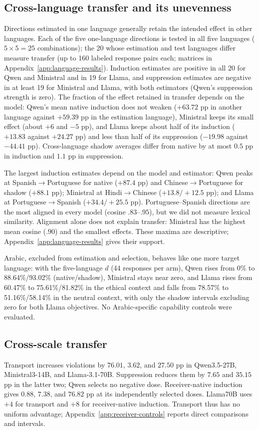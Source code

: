 \subsection{Cross-language transfer and its unevenness}
\label{sec:cross-language}
Directions estimated in one language generally retain the intended effect in other languages. Each
of the five one-language directions is tested in all five languages
($5 \times 5 = 25$ combinations); the 20 whose estimation and test
languages differ measure transfer (up to 160 labeled response pairs each; matrices in
Appendix~\ref{app:language-results}). Induction estimates are positive in all 20 for
Qwen and Ministral and in 19 for Llama, and suppression estimates are negative in at
least 19 for Ministral and Llama, with both estimators (Qwen's
suppression strength is zero). The fraction of the effect retained in transfer depends on the model: Qwen's mean native induction does not weaken ($+63.72$ pp in another language against $+59.39$ pp in the estimation language), Ministral keeps its small effect (about $+6$ and $-5$ pp), and Llama keeps about half of its induction ($+13.83$ against $+24.27$ pp) and less than half of its suppression ($-19.98$ against $-44.41$ pp). Cross-language shadow averages differ from native by at most $0.5$ pp in induction and $1.1$ pp in suppression.

The largest induction estimates depend on the model and estimator:
Qwen peaks at Spanish$\to$Portuguese for native ($+87.4$ pp) and
Chinese$\to$Portuguese for shadow ($+88.1$ pp); Ministral at
Hindi$\to$Chinese ($+13.8/+12.5$ pp); and Llama at
Portuguese$\to$Spanish ($+34.4/+25.5$ pp).
Portuguese--Spanish directions are the most aligned in every model
(cosine $.83$--$.95$), but we did not measure lexical similarity.
Alignment alone does not explain transfer: Ministral has the highest
mean cosine ($.90$) and the smallest effects. These maxima are
descriptive; Appendix~\ref{app:language-results} gives their support.

Arabic, excluded from estimation and selection, behaves like one more target language: with the five-language $d$ (44 responses per arm), Qwen rises from 0\% to 88.64\%/93.02\% (native/shadow), Ministral stays near zero, and Llama rises from 60.47\% to 75.61\%/81.82\% in the ethical context and falls from 78.57\% to 51.16\%/58.14\% in the neutral context, with only the shadow intervals excluding zero for both Llama objectives. No Arabic-specific capability controls were evaluated.

\subsection{Cross-scale transfer}
\label{sec:scale-transfer-results}
Transport increases violations by $76.01$, $3.62$, and $27.50$ pp in
Qwen3.5-27B, Ministral3-14B, and Llama-3.1-70B. Suppression reduces them by $7.65$ and $35.15$ pp in the latter two; Qwen selects no negative dose. Receiver-native induction gives $0.88$, $7.38$, and $76.82$ pp at its independently selected doses. Llama70B uses $+4$ for transport and $+8$ for receiver-native induction. Transport thus has no uniform advantage; Appendix~\ref{app:receiver-controls} reports direct comparisons and intervals.

